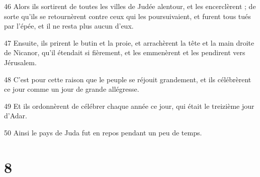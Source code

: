\par 46 Alors ils sortirent de toutes les villes de Judée alentour, et les encerclèrent ; de sorte qu'ils se retournèrent contre ceux qui les poursuivaient, et furent tous tués par l'épée, et il ne resta plus aucun d'eux.
\par 47 Ensuite, ils prirent le butin et la proie, et arrachèrent la tête et la main droite de Nicanor, qu'il étendait si fièrement, et les emmenèrent et les pendirent vers Jérusalem.
\par 48 C'est pour cette raison que le peuple se réjouit grandement, et ils célébrèrent ce jour comme un jour de grande allégresse.
\par 49 Et ils ordonnèrent de célébrer chaque année ce jour, qui était le treizième jour d'Adar.
\par 50 Ainsi le pays de Juda fut en repos pendant un peu de temps.

\chapter{8}

